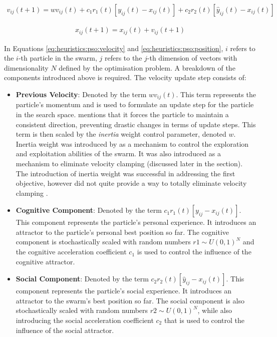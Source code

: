 \begin{equation}
      \label{eq:heuristics:pso:velocity}
      \begin{split}
            v_{ij}(t+1) = wv_{ij}(t) + c_{1}r_{1}(t)[y_{ij}(t) - x_{ij}(t)] + c_{2}r_{2}(t)[\hat{y}_{ij}(t) - x_{ij}(t)]
      \end{split}
\end{equation}

\begin{equation}
      \label{eq:heuristics:pso:position}
      \begin{split}
            x_{ij}(t+1) = x_{ij}(t) + v_{ij}(t+1)
      \end{split}
\end{equation}

In Equations \ref{eq:heuristics:pso:velocity} and \ref{eq:heuristics:pso:position}, $i$ refers to the $i$-th particle in the swarm, $j$ refers to the $j$-th dimension of vectors with dimensionality $N$ defined by the optimisation problem. A breakdown of the components introduced above is required. The velocity update step consists of:

\begin{itemize}
      \item \textbf{Previous Velocity}: Denoted by the term $wv_{ij}(t)$. This term represents the particle's momentum and is used to formulate an update step for the particle in the search space. \citeauthor{ref:vanwyk:2014}\cite{ref:vanwyk:2014} mentions that it forces the particle to maintain a consistent direction, preventing drastic changes in terms of update steps. This term is then scaled by the \textit{inertia} weight control parameter, denoted $w$. Inertia weight was introduced by \citeauthor{ref:shi:1998}\cite{ref:shi:1998} as a mechanism to control the exploration and exploitation abilities of the swarm. It was also introduced as a mechanism to eliminate velocity clamping (discussed later in the section). The introduction of inertia weight was successful in addressing the first objective, however did not quite provide a way to totally eliminate velocity clamping \cite{ref:shi:2001}.

      \item \textbf{Cognitive Component}: Denoted by the term $c_{1}r_{1}(t)[y_{ij} - x_{ij}(t)]$. This component represents the particle's personal  experience. It introduces an attractor to the particle's personal best position so far. The cognitive component is stochastically scaled with random numbers $r{1} \sim U(0,1)^N$ and the cognitive acceleration coefficient $c_{1}$ is used to control the influence of the cognitive attractor.

      \item \textbf{Social Component}: Denoted by the term $c_{2}r_{2}(t)[\hat{y}_{ij} - x_{ij}(t)]$. This component represents the particle's social  experience. It introduces an attractor to the swarm's best position so far. The social component is also stochastically scaled with random numbers $r{2} \sim U(0,1)^N$, while also introducing the social acceleration coefficient $c_{2}$ that is used to control the influence of the social attractor.
\end{itemize}

